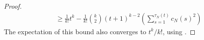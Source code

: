 \documentclass{article}
\newcommand{\E}{\mathbb{E}}
\newcommand{\1}[1]{\mathbb{I}_{#1}}
\begin{document}
\begin{proof}
\begin{align*}
&\geq \frac{1}{k!} t^k - \frac{1}{k!} \binom{k}{2} (t+1)^{k-2}  \left( \sum_{s=1}^{\tau_N(t)} c_N(s)^2 \right)
\end{align*}
The expectation of this bound also converges to $t^k/k!$, using \citet[Equation (5)]{brown2020}.

\end{proof}
\end{document}
